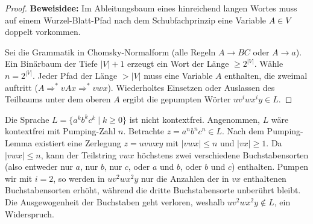 \begin{proof}
    \textbf{Beweisidee:} Im Ableitungsbaum eines hinreichend langen Wortes muss auf einem Wurzel-Blatt-Pfad nach dem Schubfachprinzip eine Variable $A \in V$ doppelt vorkommen.
    
    Sei die Grammatik in Chomsky-Normalform (alle Regeln $A \to BC$ oder $A \to a$). Ein Binärbaum der Tiefe $|V|+1$ erzeugt ein Wort der Länge $\ge 2^{|V|}$. Wähle $n = 2^{|V|}$. Jeder Pfad der Länge $> |V|$ muss eine Variable $A$ enthalten, die zweimal auftritt ($A \Rightarrow^* v A x \Rightarrow^* v w x$). Wiederholtes Einsetzen oder Auslassen des Teilbaums unter dem oberen $A$ ergibt die gepumpten Wörter $u v^i w x^i y \in L$.
\end{proof}

\begin{beispiel}
    Die Sprache $L = \{a^k b^k c^k \mid k \ge 0\}$ ist nicht kontextfrei.
    Angenommen, $L$ wäre kontextfrei mit Pumping-Zahl $n$. Betrachte $z = a^n b^n c^n \in L$. Nach dem Pumping-Lemma existiert eine Zerlegung $z = u v w x y$ mit $|v w x| \le n$ und $|v x| \ge 1$. Da $|v w x| \le n$, kann der Teilstring $v w x$ höchstens zwei verschiedene Buchstabensorten (also entweder nur $a$, nur $b$, nur $c$, oder $a$ und $b$, oder $b$ und $c$) enthalten.
    Pumpen wir mit $i=2$, so werden in $u v^2 w x^2 y$ nur die Anzahlen der in $v x$ enthaltenen Buchstabensorten erhöht, während die dritte Buchstabensorte unberührt bleibt. Die Ausgewogenheit der Buchstaben geht verloren, weshalb $u v^2 w x^2 y \notin L$, ein Widerspruch.
\end{beispiel}
